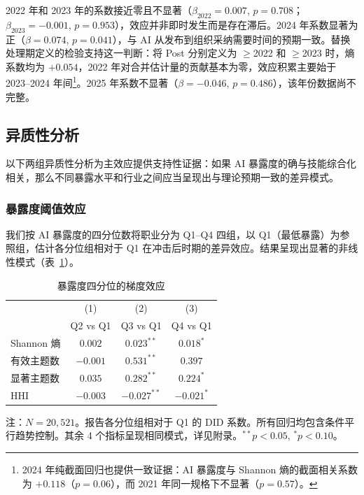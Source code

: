 \documentclass[12pt, a4paper]{article}
\begin{document}
2022 年和 2023 年的系数接近零且不显著（$\beta_{2022} = 0.007$, $p = 0.708$；$\beta_{2023} = -0.001$, $p = 0.953$），效应并非即时发生而是存在滞后。2024 年系数显著为正（$\beta = 0.074$, $p = 0.041$），与 AI 从发布到组织采纳需要时间的预期一致。替换处理期定义的检验支持这一判断：将 Post 分别定义为 $\geq$2022 和 $\geq$2023 时，熵系数均为 $+0.054$，2022 年对合并估计量的贡献基本为零，效应积累主要始于 2023--2024 年间\footnote{2024 年纯截面回归也提供一致证据：AI 暴露度与 Shannon 熵的截面相关系数为 $+0.118$（$p = 0.06$），而 2021 年同一规格下不显著（$p = 0.57$）。}。2025 年系数不显著（$\beta = -0.046$, $p = 0.486$），该年份数据尚不完整。

\subsection{异质性分析}

以下两组异质性分析为主效应提供支持性证据：如果 AI 暴露度的确与技能综合化相关，那么不同暴露水平和行业之间应当呈现出与理论预期一致的差异模式。

\subsubsection{暴露度阈值效应}

我们按 AI 暴露度的四分位数将职业分为 Q1--Q4 四组，以 Q1（最低暴露）为参照组，估计各分位组相对于 Q1 在冲击后时期的差异效应。结果呈现出显著的非线性模式（表~\ref{tab:quartile}）。

\begin{table}[htbp]
\centering
\caption{暴露度四分位的梯度效应}
\label{tab:quartile}
\begin{threeparttable}
\begin{tabular}{lccc}
\toprule
 & (1) & (2) & (3) \\
 & Q2 vs Q1 & Q3 vs Q1 & Q4 vs Q1 \\
\midrule
Shannon 熵  & $0.002$        & $0.023^{**}$   & $0.018^{*}$   \\
有效主题数  & $-0.001$       & $0.531^{**}$   & $0.397$       \\
显著主题数  & $0.035$        & $0.282^{**}$   & $0.224^{*}$   \\
HHI         & $-0.003$       & $-0.027^{**}$  & $-0.021^{*}$  \\
\bottomrule
\end{tabular}
\begin{tablenotes}[flushleft]
\small
\item 注：$N = 20{,}521$。报告各分位组相对于 Q1 的 DID 系数。所有回归均包含条件平行趋势控制。其余 4 个指标呈现相同模式，详见附录。$^{**}p<0.05$, $^{*}p<0.10$。
\end{tablenotes}
\end{threeparttable}
\end{table}
\end{document}
